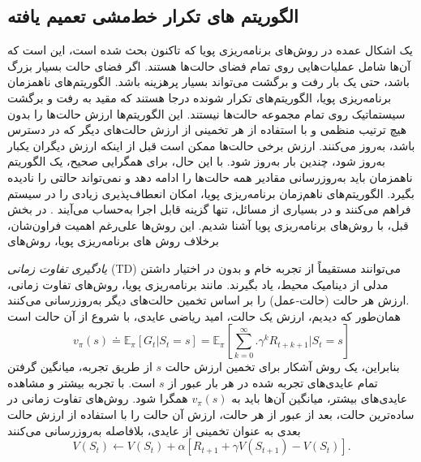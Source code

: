 \subsection{الگوریتم های تکرار خط‌مشی تعمیم یافته}
%
%
%
یک اشکال عمده در روش‌های برنامه‌ریزی پویا که تاکنون بحث شده است، این است که آن‌ها شامل عملیات‌هایی روی تمام فضای حالت‌ها هستند.
اگر فضای حالت بسیار بزرگ باشد،
حتی یک بار رفت و برگشت می‌تواند بسیار پرهزینه باشد.
الگوریتم‌های ناهمزمان برنامه‌ریزی پویا، الگوریتم‌های تکرار شونده درجا هستند که مقید به رفت و برگشت سیستماتیک روی تمام مجموعه حالت‌ها نیستند. این الگوریتم‌ها ارزش حالت‌ها را بدون هیچ ترتیب منظمی ‌و با استفاده از هر تخمینی از ارزش حالت‌های دیگر که در دسترس باشد، به‌روز می‌کنند.
 ارزش برخی حالت‌ها ممکن است قبل از اینکه ارزش دیگران یکبار به‌روز شود، چندین بار به‌روز شود. با این حال، برای همگرایی صحیح، یک الگوریتم ناهمزمان باید به‌روزرسانی مقادیر همه حالت‌ها را ادامه دهد و نمی‌تواند حالتی را نادیده بگیرد.
الگوریتم‌های ناهم‌زمان برنامه‌ریزی پویا، امکان انعطاف‌پذیری زیادی را در سیستم فراهم می‌کنند و در بسیاری از مسائل، تنها گزینه قابل اجرا به‌حساب می‌آیند 
\cite{suttonbook}.
در بخش قبل، با روش‌های برنامه‌ریزی پویا آشنا شدیم. این روش‌ها علی‌رغم اهمیت فراون‌شان،
برخلاف روش های برنامه‌ریزی پویا، روش‌های 

\textit{یادگیری تفاوت زمانی}
 (TD) می‌توانند مستقیماً از تجربه خام و بدون در اختیار داشتن مدلی از دینامیک محیط، یاد بگیرند. مانند برنامه‌ریزی پویا، روش‌های تفاوت زمانی، ارزش‌ هر حالت (حالت-عمل) را بر اساس تخمین‌ حالت‌‌های دیگر به‌روزرسانی می‌کنند.
\\همان‌طور که دیدیم، ارزش یک حالت، امید ریاضی عایدی، با شروع از آن حالت است
$$v_\pi(s) \doteq \mathbb{E}_\pi\left[G_t| S_t=s\right] = \mathbb{E}_\pi\left[\sum_{k=0}^{\infty}. \gamma^k R_{t+k+1}|S_t =s \right]$$
بنابراین، یک روش آشکار برای تخمین ارزش حالت $s$ از طریق تجربه، میانگین گرفتن تمام عایدی‌های تجربه شده در هر بار عبور از $s$ است.
با تجربه بیشتر و مشاهده عایدی‌های بیشتر، میانگین آن‌ها باید به $v_\pi(s)$ همگرا شود.
روش‌های تفاوت زمانی در ساده‌ترین حالت، بعد از عبور از هر حالت، ارزش آن حالت را با استفاده از ارزش حالت بعدی به عنوان تخمینی از عایدی، بلافاصله به‌روزرسانی می‌کنند \cite{suttonbook}
$$V(S_t) \longleftarrow V(S_t) + \alpha\left[R_{t+1} + \gamma V(S_{t+1}) - V(S_t)\right].$$

